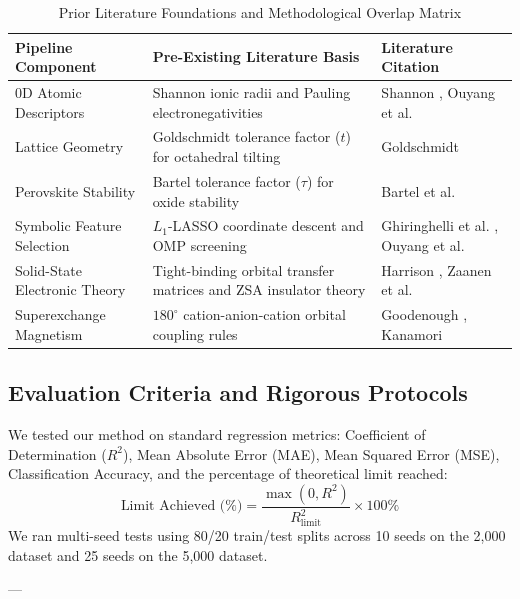 \documentclass[journal=jcisd8,manuscript=article]{achemso}
\begin{document}
\begin{table}[H]
\centering
\caption{Prior Literature Foundations and Methodological Overlap Matrix}
\label{tab:overlap_matrix}
\small
\begin{tabularx}{\textwidth}{p{} p{} X}
\toprule
\textbf{Pipeline Component} & \textbf{Pre-Existing Literature Basis} & \textbf{Literature Citation} \\
\midrule
0D Atomic Descriptors & Shannon ionic radii and Pauling electronegativities & Shannon \cite{shannon1976revised}, Ouyang et al. \cite{ouyang2018sisso} \\
Lattice Geometry & Goldschmidt tolerance factor ($t$) for octahedral tilting & Goldschmidt \cite{goldschmidt1926gesetze} \\
Perovskite Stability & Bartel tolerance factor ($\tau$) for oxide stability & Bartel et al. \cite{bartel2019new, bartel2019sciadv} \\
Symbolic Feature Selection & $L_1$-LASSO coordinate descent and OMP screening & Ghiringhelli et al. \cite{ghiringhelli2015bigdata}, Ouyang et al. \cite{ouyang2018sisso} \\
Solid-State Electronic Theory & Tight-binding orbital transfer matrices and ZSA insulator theory & Harrison \cite{harrison1999elementary}, Zaanen et al. \cite{zaanen1985band} \\
Superexchange Magnetism & $180^\circ$ cation-anion-cation orbital coupling rules & Goodenough \cite{goodenough1955theory}, Kanamori \cite{kanamori1959superexchange} \\
\bottomrule
\end{tabularx}
\end{table}

\subsection{Evaluation Criteria and Rigorous Protocols}
We tested our method on standard regression metrics: Coefficient of Determination ($R^2$), Mean Absolute Error (MAE), Mean Squared Error (MSE), Classification Accuracy, and the percentage of theoretical limit reached:
\begin{equation}
\text{Limit Achieved (\%)} = \frac{\max(0, R^2)}{R^2_{\text{limit}}} \times 100\%
\end{equation}
We ran multi-seed tests using 80/20 train/test splits across 10 seeds on the 2,000 dataset and 25 seeds on the 5,000 dataset.

---
\end{document}
